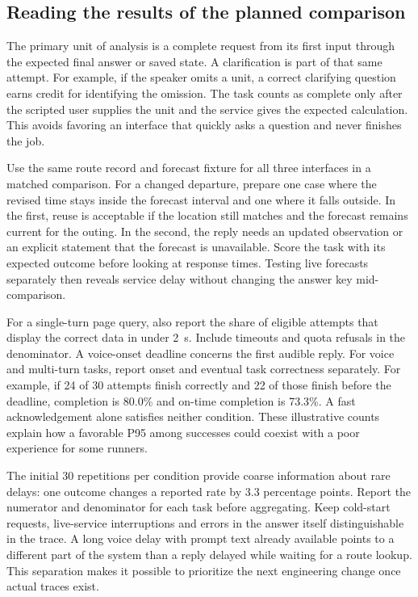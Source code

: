 \documentclass[conference]{IEEEtran}
\begin{document}
\subsection{Reading the results of the planned comparison}
The primary unit of analysis is a complete request from its first input through the expected final answer or saved state. A clarification is part of that same attempt. For example, if the speaker omits a unit, a correct clarifying question earns credit for identifying the omission. The task counts as complete only after the scripted user supplies the unit and the service gives the expected calculation. This avoids favoring an interface that quickly asks a question and never finishes the job.

Use the same route record and forecast fixture for all three interfaces in a matched comparison. For a changed departure, prepare one case where the revised time stays inside the forecast interval and one where it falls outside. In the first, reuse is acceptable if the location still matches and the forecast remains current for the outing. In the second, the reply needs an updated observation or an explicit statement that the forecast is unavailable. Score the task with its expected outcome before looking at response times. Testing live forecasts separately then reveals service delay without changing the answer key mid-comparison.

For a single-turn page query, also report the share of eligible attempts that display the correct data in under 2~s. Include timeouts and quota refusals in the denominator. A voice-onset deadline concerns the first audible reply. For voice and multi-turn tasks, report onset and eventual task correctness separately. For example, if 24 of 30 attempts finish correctly and 22 of those finish before the deadline, completion is 80.0\% and on-time completion is 73.3\%. A fast acknowledgement alone satisfies neither condition. These illustrative counts explain how a favorable P95 among successes could coexist with a poor experience for some runners.

The initial 30 repetitions per condition provide coarse information about rare delays: one outcome changes a reported rate by 3.3 percentage points. Report the numerator and denominator for each task before aggregating. Keep cold-start requests, live-service interruptions and errors in the answer itself distinguishable in the trace. A long voice delay with prompt text already available points to a different part of the system than a reply delayed while waiting for a route lookup. This separation makes it possible to prioritize the next engineering change once actual traces exist.
\end{document}
